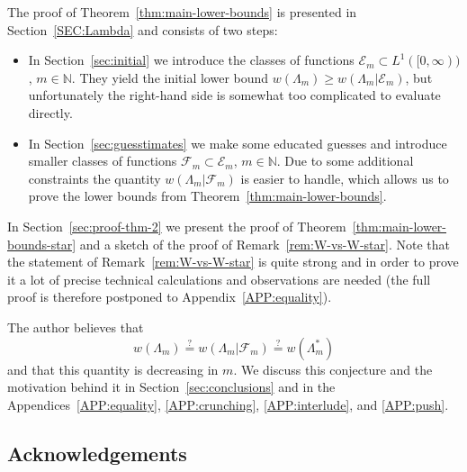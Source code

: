 \documentclass[a4paper]{amsart} %
\theoremstyle{definition}
\theoremstyle{remark}
\numberwithin{equation}{section}
\newcommand*{\LongArxivOrShortJournalVersion}[2]{#1}
\newcommand*{\NN}{\mathbb{N}}
\newcommand*{\weakconst}[1]{w(#1)} %
\newcommand*{\weakconstrestricted}[2]{w(#1|#2)} %
\newcommand*{\fclass}[1]{\mathcal{E}_{#1}}
\newcommand*{\fclassspec}[1]{\mathcal{F}_{#1}}
\begin{document}
The proof of Theorem~\ref{thm:main-lower-bounds} is presented in Section~\ref{SEC:Lambda} 
and consists of two steps:
\begin{itemize}
\item 
In Section~\ref{sec:initial} 
we introduce the classes of functions  $\fclass{m}\subset L^1([0,\infty))$,
 $m\in\NN$.
They yield the initial lower bound
 $\weakconst{\Lambda_m} \geq\weakconstrestricted{\Lambda_m}{\fclass{m}}$,
but unfortunately the right-hand side is somewhat too complicated to evaluate directly.
 \item
In Section~\ref{sec:guesstimates} we make some educated guesses
 and introduce smaller classes of functions $\fclassspec{m} \subset \fclass{m}$, $m\in\NN$.
Due to some additional constraints  the 
quantity $\weakconstrestricted{\Lambda_m}{\fclassspec{m}}$ is easier to handle,
which allows us to prove the lower bounds from Theorem~\ref{thm:main-lower-bounds}. 
 \end{itemize}


In Section~\ref{sec:proof-thm-2} we present the proof of Theorem~\ref{thm:main-lower-bounds-star}
and a sketch of the proof of Remark~\ref{rem:W-vs-W-star}.
Note that  the statement of Remark~\ref{rem:W-vs-W-star} is quite strong
and in order to prove it a lot of precise technical calculations and observations are needed (\LongArxivOrShortJournalVersion{the full proof is therefore postponed to Appendix~\ref{APP:equality}}{the full proof can be found in Appendix~A of the arXiv version of this article}).



The author believes that
\[
\weakconst{\Lambda_m} 
\overset{?}{=} \weakconstrestricted{\Lambda_m}{\fclassspec{m}}
\overset{?}{=} \weakconst{\Lambda_m^*}
\]
and that this quantity is decreasing in $m$.
\LongArxivOrShortJournalVersion{%
We discuss this conjecture and the motivation behind it
in Section~\ref{sec:conclusions} 
and in the Appendices~\ref{APP:equality}, \ref{APP:crunching}, \ref{APP:interlude},
and  \ref{APP:push}.}{%
We discuss this conjecture and the motivation behind it
in Section~\ref{sec:conclusions} 
and in the appendices 
of the arXiv version of this paper, available on \url{https://arxiv.org/abs/2411.09340v2};
those appendices contain a complete and detailed proof of Remark~\ref{rem:W-vs-W-star}, the proof of the lower bound  $\weakconstrestricted{\Lambda_m}{\fclassspec{m}} \geq 1.34$ for every $m\in\NN$, and some additional asymptotic considerations.}


\subsection{Acknowledgements}
\end{document}
